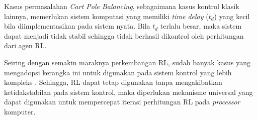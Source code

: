 Kasus permasalahan \textit{Cart Pole Balancing}, sebagaimana kasus kontrol klasik lainnya, memerlukan sistem komputasi yang memiliki \textit{time delay} (\(t_d\)) yang kecil bila diimplementasikan pada sistem nyata. Bila \(t_d\) terlalu besar, maka sistem dapat menjadi tidak stabil sehingga tidak berhasil dikontrol oleh perhitungan dari agen \ac{RL}.

Seiring dengan semakin maraknya perkembangan \ac{RL}, sudah banyak kasus yang mengadopsi kerangka ini untuk digunakan pada sistem kontrol yang lebih kompleks \parencite{hubert2022perancangan, dawne2023algoritma, mardhatillah2023strategi}. Sehingga, \ac{RL} dapat tetap digunakan tanpa mengakibatkan ketidakstabilan pada sistem kontrol, maka diperlukan mekanisme universal yang dapat digunakan untuk mempercepat iterasi perhitungan RL pada \textit{processor} komputer.
